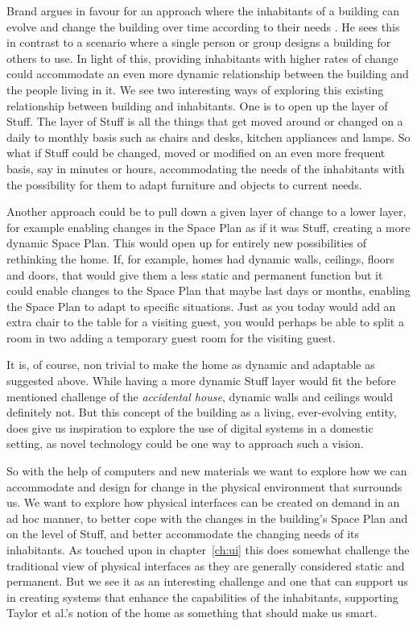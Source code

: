 Brand argues in favour for an approach where the inhabitants of a building can evolve and change the building over time according to their needs \citep{brandBBCvideo}.
He sees this in contrast to a scenario where a single person or group designs a building for others to use.
In light of this, providing inhabitants with higher rates of change could accommodate an even more dynamic relationship between the building and the people living in it.
\blank
We see two interesting ways of exploring this existing relationship between building and inhabitants.
One is to open up the layer of Stuff.
The layer of Stuff is all the things that get moved around or changed on a daily to monthly basis such as chairs and desks, kitchen appliances and lamps.
So what if Stuff could be changed, moved or modified on an even more frequent basis, say in minutes or hours, accommodating the needs of the inhabitants with the possibility for them to adapt furniture and objects to current needs.

Another approach could be to pull down a given layer of change to a lower layer, for example enabling changes in the Space Plan as if it was Stuff, creating a more dynamic Space Plan.
This would open up for entirely new possibilities of rethinking the home. 
If, for example, homes had dynamic walls, ceilings, floors and doors, that would give them a less static and permanent function but it could enable changes to the Space Plan that maybe last days or months, enabling the Space Plan to adapt to specific situations.
Just as you today would add an extra chair to the table for a visiting guest, you would perhaps be able to split a room in two adding a temporary guest room for the visiting guest.

It is, of course, non trivial to make the home as dynamic and adaptable as suggested above.
While having a more dynamic Stuff layer would fit the before mentioned challenge of the \emph{accidental house}, dynamic walls and ceilings would definitely not. 
But this concept of the building as a living, ever-evolving entity, does give us inspiration to explore the use of digital systems in a domestic setting, as novel technology could be one way to approach such a vision.

So with the help of computers and new materials we want to explore how we can accommodate and design for change in the physical environment that surrounds us.
We want to explore how physical interfaces can be created on demand in an ad hoc manner, to better cope with the changes in the building's Space Plan and on the level of Stuff, and better accommodate the changing needs of its inhabitants.
As touched upon in chapter~\ref{ch:ui} this does somewhat challenge the traditional view of physical interfaces as they are generally considered static and permanent.
But we see it as an interesting challenge and one that can support us in creating systems that enhance the capabilities of the inhabitants, supporting Taylor et al.'s notion of the home as something that should make us smart.